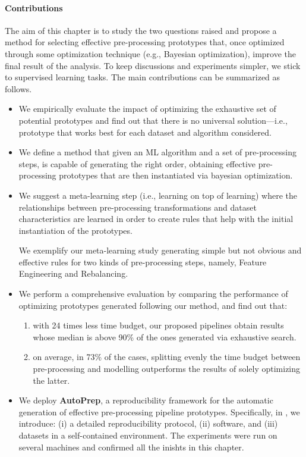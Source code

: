 \paragraph{Contributions} The aim of this chapter is to study the two questions raised and propose a method for selecting effective pre-processing prototypes that, once optimized through some optimization technique (e.g., Bayesian optimization), improve the final result of the analysis.
To keep discussions and experiments simpler, we stick to supervised learning tasks.
The main contributions can be summarized as follows.
\begin{itemize}
    \item We empirically evaluate the impact of optimizing the exhaustive set of potential prototypes and find out that	there is no universal solution---i.e., prototype that works best for each dataset and algorithm considered.
    \item We define a method that given an ML algorithm and a set of pre-processing steps, is capable of generating the right order, obtaining effective pre-processing prototypes that are then instantiated via bayesian optimization.
    \item We suggest a meta-learning step (i.e., learning on top of learning) where the relationships between pre-processing transformations and dataset characteristics are learned in order to create rules that help with the initial instantiation of the prototypes.

	We exemplify our meta-learning study generating simple but not obvious and effective rules for two kinds of pre-processing steps, namely, Feature Engineering and Rebalancing.
    \item We perform a comprehensive evaluation by comparing the performance of optimizing prototypes generated following our method, and find out that:
    \begin{enumerate}
        \item with 24 times less time budget, our proposed pipelines obtain results whose median is above 90\% of the ones generated via exhaustive search.
        \item on average, in 73\% of the cases, splitting evenly the time budget between pre-processing and modelling outperforms the results of solely optimizing the latter.
    \end{enumerate}
	\item We deploy \textbf{AutoPrep}, a reproducibility framework for the automatic generation of effective pre-processing pipeline prototypes. Specifically, in \cite{}, we introduce: (i) a detailed reproducibility protocol, (ii) software, and (iii) datasets in a self-contained environment.
	The experiments were run on several machines and confirmed all the inishts in this chapter.
\end{itemize}


